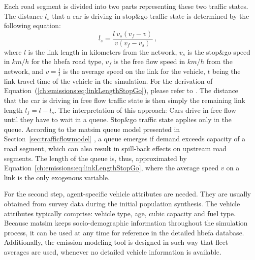 %
Each road segment is divided into two parts representing these two 
traffic states. The distance $l_s$ that a car is driving in stop\&go traffic 
state is determined by the following equation:
%
\begin{equation}
l_s = \frac{l \ v_s  (v_f-v)}{v (v_f - v_s)} \ ,
\label{ch:emissions:eq:linkLengthStopGo}
\end{equation}
%
where $l$ is the link length in kilometers from the network, $v_s$ is the stop\&go speed in $km/h$ for the \gls{hbefa} road type, $v_f$ is the free flow speed in $km/h$ from the network, and $v=\frac{l}{t}$ is the average speed on the link for the vehicle, $t$ being the link travel time of the vehicle in the simulation. For the derivation of Equation~(\ref{ch:emissions:eq:linkLengthStopGo}), please refer to \citet{Kickhoefer_PhDThesis_2014}. The distance that the car is driving in free flow traffic state is then simply the remaining link length $l_f = l - l_s$.
%
The interpretation of this approach:
%
Cars drive in free flow until they have to wait in a queue. Stop\&go traffic state applies only in the queue. According to the \gls{matsim} queue model presented in Section~\ref{sec:trafficflowmodel}
%
%
, a queue emerges if demand exceeds capacity of a road segment, which can also result in spill-back effects on upstream road segments. The length of the queue is, thus, approximated by Equation~\ref{ch:emissions:eq:linkLengthStopGo}, where the average speed $v$ on a link is the only exogenous variable.

For the second step, agent-specific vehicle attributes are needed. They are 
usually obtained from survey data during the initial population 
synthesis. The vehicle attributes typically comprise: vehicle type, age, cubic 
capacity and fuel type. Because \gls{matsim} keeps socio-demographic information throughout 
the simulation process, it can be used at any time for reference in the 
detailed \gls{hbefa} database. Additionally, the emission modeling tool 
is designed in such way that fleet averages are used, whenever no detailed 
vehicle information is available.

